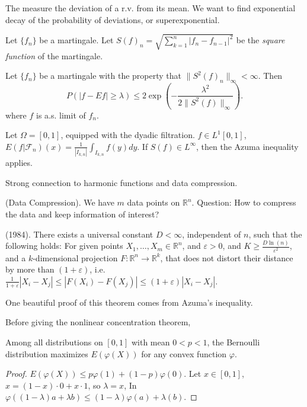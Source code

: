 
The measure the deviation of a r.v. from its mean. We want to find exponential decay of the probability of deviations, or superexponential.

	Let $\{f_n\} $ be a martingale. Let $S(f)_n = \sqrt{\sum_{k=1}^{n} |f_n - f_{n-1}|^2} $ be the \textit{square function} of the martingale. 

\begin{proposition}
	Let $\{f_n\} $ be a martingale with the property that $\|S^2(f)_n\|_\infty <\infty $. Then
	\[
		P(|f - E f| \ge \lambda) \le 
		2 \exp\left( - \frac{\lambda^2}{2 \|S^2(f)\|_\infty } \right) 
	.\] 
	where $f$ is a.s. limit of $f_n$.
\end{proposition}

\begin{example}
	Let $\Omega = [0,1]$, equipped with the dyadic filtration. 
	$f \in L^1[0,1]$, $E(f | \mathcal{F}_n)(x) = \frac{1}{|I_{k,n}|} \int _{I_{k,n}} f(y) dy$. 
	If $S(f) \in L^\infty $, then the Azuma inequality applies.

	Strong connection to harmonic functions and data compression. 
\end{example}

\begin{example}
	(Data Compression). We have $m$ data points on  $\mathbb{R}^n$. Question: How to compress the data and keep information of interest?

	\begin{theorem}
		(1984). There exists a universal constant $D < \infty $, independent of $n$, such that the following holds: For given points $X_1, \ldots, X_m \in \mathbb{R}^n$, and $\varepsilon>0$, and  $K \ge \frac{D \ln(n)}{\varepsilon^2}$, and a $k$-dimensional projection $F: \mathbb{R}^n \to \mathbb{R}^k$, that does not distort their distance by more than $(1 + \varepsilon)$, i.e. $\frac{1}{1 + \varepsilon}|X_i - X_j| \le |F(X_i) - F(X_j)| \le (1 + \varepsilon) |X_i - X_j|$.
	\end{theorem}
	One beautiful proof of this theorem comes from Azuma's inequality.
\end{example}

Before giving the nonlinear concentration theorem,

\begin{corollary}
	Among all distributions on $[0,1]$ with mean $0 < p < 1$, the Bernoulli distribution maximizes $E(\varphi(X))$ for any convex function $\varphi$.
\end{corollary}
\begin{proof}
	$E(\varphi(X)) \le p \varphi(1) + (1 - p) \varphi(0)$. Let $x \in [0,1]$, $x = (1 - x) \cdot 0 + x \cdot 1$, so $\lambda = x$, In $\varphi\left( (1 - \lambda) a + \lambda b \right)  \le  (1 - \lambda) \varphi(a) + \lambda(b)$.
\end{proof}

